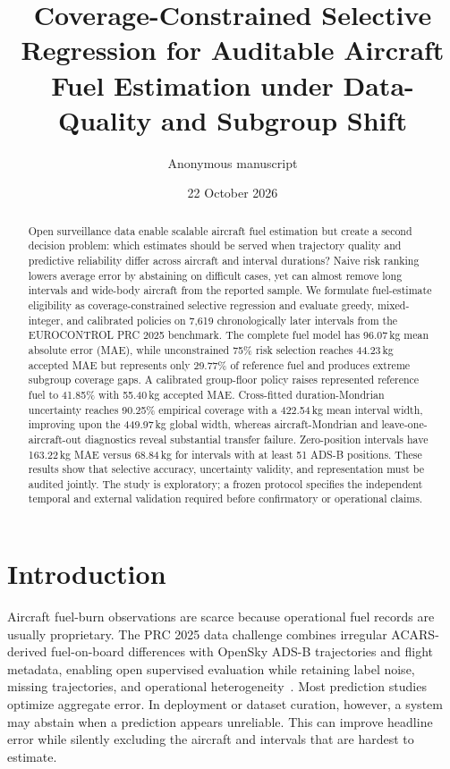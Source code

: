 \documentclass[11pt]{article}
\title{Coverage-Constrained Selective Regression for Auditable Aircraft Fuel Estimation under Data-Quality and Subgroup Shift}
\author{Anonymous manuscript}
\date{22 October 2026}
\begin{document}
\maketitle

\begin{abstract}
Open surveillance data enable scalable aircraft fuel estimation but create a second decision problem: which estimates should be served when trajectory quality and predictive reliability differ across aircraft and interval durations? Naive risk ranking lowers average error by abstaining on difficult cases, yet can almost remove long intervals and wide-body aircraft from the reported sample. We formulate fuel-estimate eligibility as coverage-constrained selective regression and evaluate greedy, mixed-integer, and calibrated policies on 7,619 chronologically later intervals from the EUROCONTROL PRC 2025 benchmark. The complete fuel model has 96.07\,kg mean absolute error (MAE), while unconstrained 75\% risk selection reaches 44.23\,kg accepted MAE but represents only 29.77\% of reference fuel and produces extreme subgroup coverage gaps. A calibrated group-floor policy raises represented reference fuel to 41.85\% with 55.40\,kg accepted MAE. Cross-fitted duration-Mondrian uncertainty reaches 90.25\% empirical coverage with a 422.54\,kg mean interval width, improving upon the 449.97\,kg global width, whereas aircraft-Mondrian and leave-one-aircraft-out diagnostics reveal substantial transfer failure. Zero-position intervals have 163.22\,kg MAE versus 68.84\,kg for intervals with at least 51 ADS-B positions. These results show that selective accuracy, uncertainty validity, and representation must be audited jointly. The study is exploratory; a frozen protocol specifies the independent temporal and external validation required before confirmatory or operational claims.
\end{abstract}

\section{Introduction}
Aircraft fuel-burn observations are scarce because operational fuel records are usually proprietary. The PRC 2025 data challenge combines irregular ACARS-derived fuel-on-board differences with OpenSky ADS-B trajectories and flight metadata, enabling open supervised evaluation while retaining label noise, missing trajectories, and operational heterogeneity~\cite{sun2026}. Most prediction studies optimize aggregate error. In deployment or dataset curation, however, a system may abstain when a prediction appears unreliable. This can improve headline error while silently excluding the aircraft and intervals that are hardest to estimate.
\end{document}
